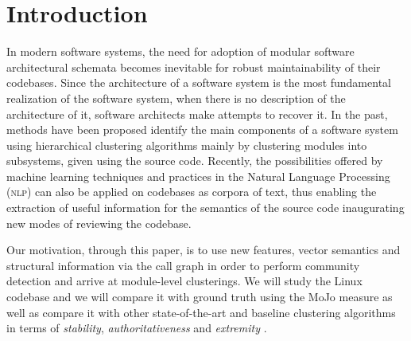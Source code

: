 \documentclass[sigconf]{acmart}
\begin{document}
%



\maketitle

\section{Introduction}




In modern software systems, the need for adoption of modular software architectural schemata 
becomes inevitable for robust maintainability of their codebases.
Since the architecture of a software system is the most fundamental realization of the 
software system, when there is no description of the architecture of it, software 
architects make attempts to recover it. In the past, methods have been proposed 
identify the main components of a software system using hierarchical clustering 
algorithms \cite{maqbool_overview, limbo} mainly by clustering modules into subsystems, given 
using the source code.    
Recently, the possibilities offered by machine learning techniques and practices in the Natural Language Processing (\textsc{nlp}) 
can also be applied on codebases as corpora of text, thus enabling 
the extraction of useful information for the semantics of the source code 
inaugurating new modes of reviewing the codebase. 

Our motivation, through this paper, is to use new features, vector semantics and structural information via the call graph in order to perform community detection and arrive at module-level clusterings. 
We will study the Linux codebase and we will compare it with ground truth  using the MoJo measure \cite{mojo} as well as 
compare it with other state-of-the-art and baseline clustering algorithms  in terms of \emph{stability}, \emph{authoritativeness} and \emph{extremity}
\cite{maqbool_overview, evaluation}.
\end{document}
